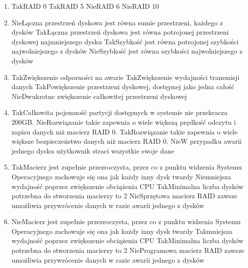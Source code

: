 \begin{enumerate}
	\newpage
	\item {}%
	{Tak}{RAID 0}%
	{Tak}{RAID 5}%
	{Nie}{RAID 6}%
	{Nie}{RAID 10}
	\item {}%
	{Nie}{Łączna przestrzeń dyskowa jest równa sumie przestrzeni, każdego z dysków}%
	{Tak}{Łączna przestrzeń dyskowa jest równa potrojonej przestrzeni dyskowej najmniejszego dysku}%
	{Tak}{Szybkość jest równa potrojonej szybkości najwolniejszego z dysków}%
	{Nie}{Szybkość jest równa szybkości najwolniejszego z dysków}
	\item {}%
	{Tak}{Zwiększenie odporności na awarie}%
	{Tak}{Zwiększenie wydajności transmisji danych}%
	{Tak}{Powiększenie przestrzeni dyskowej, dostępnej jako jedna całość}%
	{Nie}{Dwukrotne zwiększenie całkowitej przestrzeni dyskowej}
	\item {}%
	{Tak}{Całkowita pojemność partycji dostępnych w systemie nie przekracza 200GB.}%
	{Nie}{Rozwiązanie takie zapewnia o wiele większą prędkość odczytu i zapisu danych niż macierz RAID 0.}%
	{Tak}{Rozwiązanie takie zapewnia o wiele większe bezpieczeństwo danych niż macierz RAID 0.}%
	{Nie}{W przypadku awarii jednego dysku użytkownik straci wszystkie swoje dane}
	\item {}%
	{Tak}{Macierz jest zupełnie przezroczysta, przez co z punktu widzenia Systemu Operacyjnego zachowuje się ona jak każdy inny dysk twardy}%
	{Nie}{mniejsza wydajność poprzez zwiększenie obciążenia CPU}%
	{Tak}{Minimalna liczba dysków potrzebna do stworzenia macierzy to 2}%
	{Nie}{Sprzętowa macierz RAID zawsze umożliwia przywrócenie danych w razie awarii jednego z dysków}
	\item {}%
	{Nie}{Macierz jest zupełnie przezroczysta, przez co z punktu widzenia Systemu Operacyjnego zachowuje się ona jak każdy inny dysk twardy}%
	{Tak}{mniejsza wydajność poprzez zwiększenie obciążenia CPU}%
	{Tak}{Minimalna liczba dysków potrzebna do stworzenia macierzy to 2}%
	{Nie}{Programowa macierz RAID zawsze umożliwia przywrócenie danych w razie awarii jednego z dysków}
	

\end{enumerate}
